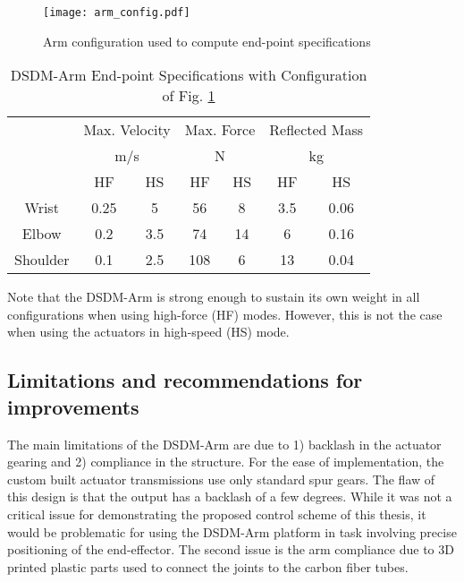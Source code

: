 \begin{figure}[htb]
	\centering
		\texttt{[image: arm\_config.pdf]}
	\caption{Arm configuration used to compute end-point specifications}
	\label{fig:arm_config}
\end{figure}

\begin{table}[htpb]
	\centering
	\caption[DSDM-Arm End-point Specifications]{DSDM-Arm End-point Specifications with Configuration of Fig. \ref{fig:arm_config}}
		\begin{tabular}{ c c c c c c c }
			\hline
			   & \multicolumn{2}{c}{Max. Velocity} & \multicolumn{2}{c}{Max. Force} & \multicolumn{2}{c}{Reflected Mass}\\
			   & \multicolumn{2}{c}{m/s} & \multicolumn{2}{c}{N} & \multicolumn{2}{c}{kg } \\
				\hline
			  & HF & HS & HF & HS & HF & HS \\
			\hline
			 Wrist    & 0.25 & 5    & 56  &  8  & 3.5 & 0.06   \\
			 Elbow    & 0.2  & 3.5  & 74  &  14 & 6   & 0.16    \\
			 Shoulder & 0.1  & 2.5  & 108 &  6  & 13  & 0.04    \\
			\hline
		\end{tabular}
	\label{tab:robotspec2}
\end{table}

Note that the DSDM-Arm is strong enough to sustain its own weight in all configurations when using high-force (HF) modes. However, this is not the case when using the actuators in high-speed (HS) mode. 


\subsection{Limitations and recommendations for improvements} 

The main limitations of the DSDM-Arm are due to 1) backlash in the actuator gearing and 2) compliance in the structure. For the ease of implementation, the custom built actuator transmissions use only standard spur gears. The flaw of this design is that the output has a backlash of a few degrees. While it was not a critical issue for demonstrating the proposed control scheme of this thesis, it would be problematic for using the DSDM-Arm platform in task involving precise positioning of the end-effector. The second issue is the arm compliance due to 3D printed plastic parts used to connect the joints to the carbon fiber tubes. 


